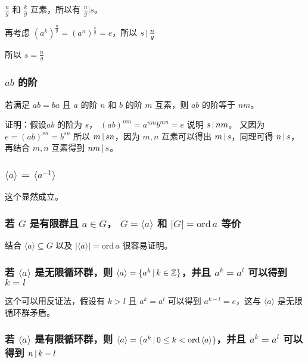 $\frac{n}{g}$ 和 $\frac{k}{g}$ 互素，所以有  $\frac{n}{g} \vert s$。

再考虑 $(a^k)^{\frac{n}{g}} = (a ^ {n})^{\frac{k}{g}} = e$，所以 $s \,\vert\, \frac{n}{g} $

所以 $s = \frac{n}{g}$


\subsubsection{$ab$ 的阶}

若满足 $ab = ba$ 且 $a$ 的阶 $n$ 和 $b$ 的阶 $m$ 互素，则 $ab$ 的阶等于 $nm$。

证明：假设$ab$ 的阶为 $s$， $(ab)^{nm} = a^{nm}b^{mn} = e$ 说明 $s \,\vert\, nm$。
又因为 $e = (ab)^{sn} = b^{sn}$ 所以 $m \,\vert\, sn$，因为 $m,n$ 互素可以得出 $m \,\vert\, s$，同理可得 $n \,\vert\, s$，再结合 $m,n $ 互素得到 $nm \,\vert\, s$。


\subsubsection{$\langle a \rangle$ = $\langle a^{-1} \rangle$}

这个显然成立。

\subsubsection{若 $G$ 是有限群且 $a \in G$， $G = \langle a \rangle$ 和 $\lvert G \rvert =  \mathrm{ord}\,a$ 等价}

结合 $\langle a \rangle \subseteq G$ 以及 $\lvert \langle a \rangle \rvert = \mathrm{ord}\, a$ 很容易证明。

\subsubsection{若 $\langle a \rangle$ 是无限循环群，则 $\langle a \rangle =  \{ a^{k} \,\vert\, k \in \mathbb{Z}\}$，并且 $a^k = a^l$ 可以得到 $k=l$}

这个可以用反证法，假设有 $k > l$ 且 $a^k = a^l$ 可以得到 $a^{k-l} = e$，这与 $\langle  a \rangle$ 是无限循环群矛盾。

\subsubsection{若 $\langle a \rangle$ 是有限循环群，则 $\langle a \rangle =  \{ a^{k} \,\vert\, 0 \le k < \mathrm{ord}\, \langle a \rangle \}$，并且 $a^k = a^l$ 可以得到 $n \,\vert\, k -l $}

